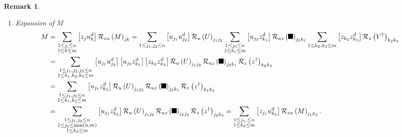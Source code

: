 \documentclass[aps,preprint]{revtex4}%
\providecommand{\U}[1]{\protect\rule{.1in}{.1in}}
\newtheorem{remark}[theorem]{Remark}
\begin{document}
\begin{remark}
\begin{enumerate}
\begin{enumerate}
\end{enumerate}

\item Expansion of $M$%
\begin{align}
M  &  =\sum_{\substack{1\leq j,\leq n\\1\leq k\leq m}}\left[  z_{j}u_{k}%
^{d}\right]  \mathcal{R}_{zu}\left(  M\right)  _{jk}=\sum_{1\leq j_{1}%
,j_{2}\leq n}\left[  u_{j_{1}}u_{j_{2}}^{d}\right]  \mathcal{R}_{u}\left(
U\right)  _{j_{1}j_{2}}\sum_{\substack{1\leq j_{3}\leq n\\1\leq k_{1}\leq
m}}\left[  u_{j_{3}}z_{k_{1}}^{d}\right]  \mathcal{R}_{uz}\left(  \U{3a3}
\right)  _{j_{3}k_{1}}\sum_{1\leq k_{2},k_{3}\leq m}\left[  z_{k_{2}}z_{k_{3}%
}^{d}\right]  \mathcal{R}_{z}\left(  V^{\dagger}\right)  _{k_{2}k_{3}}\\
&  =\sum_{\substack{1\leq j_{1},j_{2},j_{3}\leq n\\1\leq k_{1},k_{2},k_{3}\leq
m}}\left[  u_{j_{1}}u_{j_{2}}^{d}\right]  \left[  u_{j_{3}}z_{k_{1}}%
^{d}\right]  \left[  z_{k_{2}}z_{k_{3}}^{d}\right]  \mathcal{R}_{u}\left(
U\right)  _{j_{1}j_{2}}\mathcal{R}_{uz}\left(  \U{3a3} \right)  _{j_{3}k_{1}%
}\mathcal{R}_{z}\left(  z^{\dagger}\right)  _{k_{2}k_{3}}\\
&  =\sum_{\substack{1\leq j_{1},j_{2}\leq n\\1\leq k_{1},k_{3}\leq m}}\left[
u_{j_{1}}z_{k_{3}}^{d}\right]  \mathcal{R}_{u}\left(  U\right)  _{j_{1}j_{2}%
}\mathcal{R}_{uz}\left(  \U{3a3} \right)  _{j_{2}k_{1}}\mathcal{R}_{z}\left(
z^{\dagger}\right)  _{k_{1}k_{3}}\\
&  =\sum_{\substack{1\leq j_{1},j_{2}\leq n\\1\leq j_{2}\leq\min\left(
n,m\right)  \\1\leq k_{3}\leq m}}\left[  u_{j_{1}}z_{k_{3}}^{d}\right]
\mathcal{R}_{u}\left(  U\right)  _{j_{1}j_{2}}\mathcal{R}_{uz}\left(  \U{3a3}
\right)  _{j_{2}j_{2}}\mathcal{R}_{z}\left(  z^{\dagger}\right)  _{j_{2}k_{3}%
}=\sum_{\substack{1\leq j_{1},\leq n\\1\leq k_{3}\leq m}}\left[  z_{j_{1}%
}u_{k_{3}}^{d}\right]  \mathcal{R}_{zu}\left(  M\right)  _{j_{1}k_{3}}.
\end{align}



\end{enumerate}
\end{remark}
\end{document}
